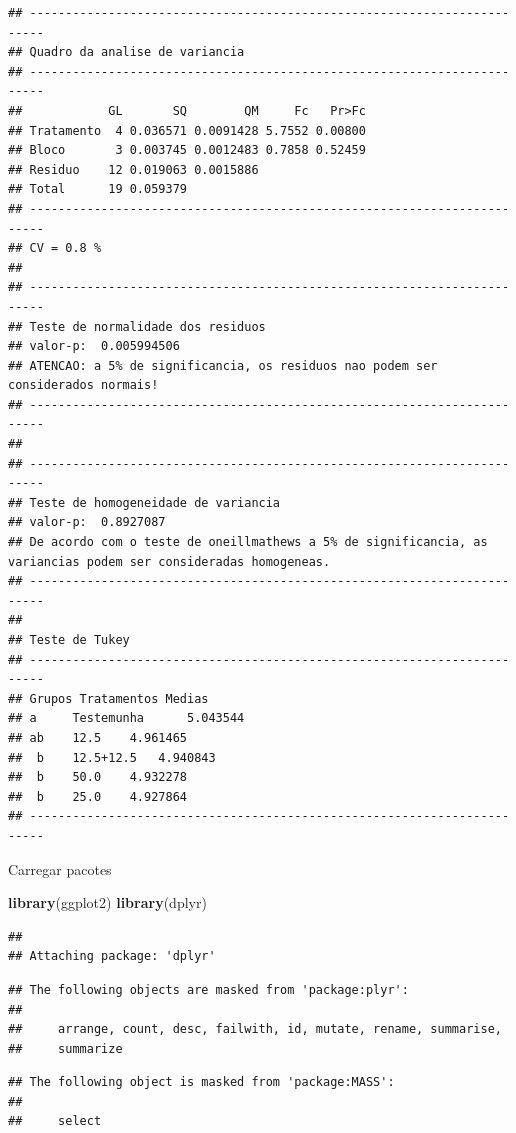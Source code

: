 \documentclass[
]{book}
\newenvironment{Shaded}{\begin{snugshade}}{\end{snugshade}}
\newcommand{\KeywordTok}[1]{\textcolor[rgb]{0.13,0.29,0.53}{\textbf{#1}}}
\newcommand{\NormalTok}[1]{#1}
\begin{document}
\begin{verbatim}
## ------------------------------------------------------------------------
## Quadro da analise de variancia
## ------------------------------------------------------------------------
##            GL       SQ        QM     Fc   Pr>Fc
## Tratamento  4 0.036571 0.0091428 5.7552 0.00800
## Bloco       3 0.003745 0.0012483 0.7858 0.52459
## Residuo    12 0.019063 0.0015886               
## Total      19 0.059379                         
## ------------------------------------------------------------------------
## CV = 0.8 %
## 
## ------------------------------------------------------------------------
## Teste de normalidade dos residuos 
## valor-p:  0.005994506 
## ATENCAO: a 5% de significancia, os residuos nao podem ser considerados normais!
## ------------------------------------------------------------------------
## 
## ------------------------------------------------------------------------
## Teste de homogeneidade de variancia 
## valor-p:  0.8927087 
## De acordo com o teste de oneillmathews a 5% de significancia, as variancias podem ser consideradas homogeneas.
## ------------------------------------------------------------------------
## 
## Teste de Tukey
## ------------------------------------------------------------------------
## Grupos Tratamentos Medias
## a     Testemunha      5.043544 
## ab    12.5    4.961465 
##  b    12.5+12.5   4.940843 
##  b    50.0    4.932278 
##  b    25.0    4.927864 
## ------------------------------------------------------------------------
\end{verbatim}

Carregar pacotes

\begin{Shaded}
\begin{Highlighting}[]
\KeywordTok{library}\NormalTok{(ggplot2)}
\KeywordTok{library}\NormalTok{(dplyr)}
\end{Highlighting}
\end{Shaded}

\begin{verbatim}
## 
## Attaching package: 'dplyr'
\end{verbatim}

\begin{verbatim}
## The following objects are masked from 'package:plyr':
## 
##     arrange, count, desc, failwith, id, mutate, rename, summarise,
##     summarize
\end{verbatim}

\begin{verbatim}
## The following object is masked from 'package:MASS':
## 
##     select
\end{verbatim}
\end{document}
